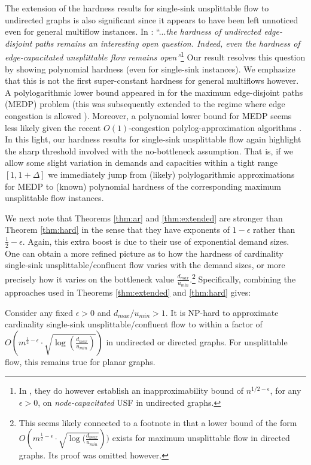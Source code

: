\documentclass[12pt]{article}
\begin{document}
The extension of the hardness results for single-sink unsplittable flow to undirected graphs is also significant since
it appears to have been left unnoticed even
for  general multiflow instances.
In \cite{guruswami2003near}: ``...{\em the hardness of undirected edge-disjoint paths remains an
interesting open question. Indeed, even the hardness of
edge-capacitated unsplittable flow remains open''}\footnote{In \cite{guruswami2003near}, they do however establish
an inapproximability bound of $n^{1/2-\epsilon}$, for any $\epsilon > 0$,
on {\em node-capacitated} {\sf USF} in undirected graphs.}  Our result resolves this question by showing
polynomial hardness (even for single-sink instances). We emphasize that this is not the first
super-constant hardness for general multiflows however.
  A polylogarithmic  lower bound appeared in \cite{andrews2006logarithmic} for the maximum
  edge-disjoint paths (MEDP) problem (this was subsequently extended to the regime where edge congestion is
  allowed \cite{andrews2010inapproximability}).
Moreover,  a polynomial lower bound for MEDP seems less likely given the recent $O(1)$-congestion polylog-approximation
algorithms \cite{chuzhoy2012routing,chuzhoy2012polylogarithimic}.
In this light, our hardness results for single-sink
unsplittable flow again highlight the sharp threshold involved with the no-bottleneck assumption.
That is, if we allow some slight
variation in demands and capacities within a tight range $[1,1+\Delta]$  we immediately jump from (likely)
polylogarithmic approximations for MEDP to  (known) polynomial hardness of the corresponding maximum
unsplittable flow instances.



We next note that Theorems \ref{thm:ar} and \ref{thm:extended} are stronger than Theorem \ref{thm:hard}
in the sense that they have exponents of $1-\epsilon$ rather than $\frac12-\epsilon$. Again, this extra boost is due to their
use of exponential demand sizes. One can obtain
a more refined picture as to how the hardness of cardinality single-sink unsplittable/confluent flow varies with
 the demand sizes, or more precisely how it varies on the bottleneck
 value $\frac{d_{max}}{u_{min}}$.\footnote{This seems likely connected to  a footnote in \cite{azar2001strongly}
 that a lower bound of the
 form $O(m^{\frac12-\epsilon}\cdot \sqrt{\log (\frac{d_{max}}{u_{min}}}))$ exists for maximum unsplittable flow in
 directed graphs. Its proof was omitted however.}
Specifically, combining the approaches used in Theorems \ref{thm:extended} and \ref{thm:hard} gives:
\begin{thm}
\label{thm:harder} Consider any fixed $\epsilon > 0$ and  $d_{max}/u_{min} > 1$.
It is NP-hard to approximate cardinality single-sink unsplittable/confluent flow
to within a factor of $O(m^{\frac12-\epsilon}\cdot \sqrt{\log (\frac{d_{max}}{u_{min}})})$
in undirected or directed graphs. For unsplittable flow, this remains true for planar graphs.
\end{thm}
\end{document}
